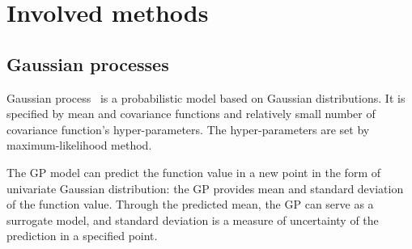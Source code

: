 \documentclass{itatnew}
\begin{document}
\section{Involved methods}

\subsection{Gaussian processes}

Gaussian process~\cite{rasmussen_gaussian_2006} is a probabilistic model based on Gaussian distributions. 
It is specified by mean and covariance functions and relatively small number of covariance function's hyper-parameters. 
The hyper-parameters are set by maximum-likelihood method.

The GP model can predict the function value in a new point in the form of univariate Gaussian distribution: the GP provides mean and standard deviation of the function value. Through the predicted mean, the GP can serve as a surrogate model, and standard deviation is a measure of uncertainty of the prediction in a specified point.
\end{document}
